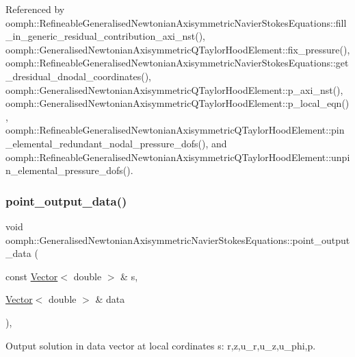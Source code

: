 Referenced by oomph\+::\+Refineable\+Generalised\+Newtonian\+Axisymmetric\+Navier\+Stokes\+Equations\+::fill\+\_\+in\+\_\+generic\+\_\+residual\+\_\+contribution\+\_\+axi\+\_\+nst(), oomph\+::\+Generalised\+Newtonian\+Axisymmetric\+Q\+Taylor\+Hood\+Element\+::fix\+\_\+pressure(), oomph\+::\+Refineable\+Generalised\+Newtonian\+Axisymmetric\+Navier\+Stokes\+Equations\+::get\+\_\+dresidual\+\_\+dnodal\+\_\+coordinates(), oomph\+::\+Generalised\+Newtonian\+Axisymmetric\+Q\+Taylor\+Hood\+Element\+::p\+\_\+axi\+\_\+nst(), oomph\+::\+Generalised\+Newtonian\+Axisymmetric\+Q\+Taylor\+Hood\+Element\+::p\+\_\+local\+\_\+eqn(), oomph\+::\+Refineable\+Generalised\+Newtonian\+Axisymmetric\+Q\+Taylor\+Hood\+Element\+::pin\+\_\+elemental\+\_\+redundant\+\_\+nodal\+\_\+pressure\+\_\+dofs(), and oomph\+::\+Refineable\+Generalised\+Newtonian\+Axisymmetric\+Q\+Taylor\+Hood\+Element\+::unpin\+\_\+elemental\+\_\+pressure\+\_\+dofs().

\mbox{\label{classoomph_1_1GeneralisedNewtonianAxisymmetricNavierStokesEquations_a8a97a39b3421984ca59a665be4abc2d8}} 
\subsubsection{\texorpdfstring{point\+\_\+output\+\_\+data()}{point\_output\_data()}}
{\footnotesize\ttfamily void oomph\+::\+Generalised\+Newtonian\+Axisymmetric\+Navier\+Stokes\+Equations\+::point\+\_\+output\+\_\+data (\begin{DoxyParamCaption}\item[{const \hyperlink{classoomph_1_1Vector}{Vector}$<$ double $>$ \&}]{s,  }\item[{\hyperlink{classoomph_1_1Vector}{Vector}$<$ double $>$ \&}]{data }\end{DoxyParamCaption})\hspace{0.3cm}{\ttfamily [inline]}, {\ttfamily [virtual]}}



Output solution in data vector at local cordinates s\+: r,z,u\+\_\+r,u\+\_\+z,u\+\_\+phi,p. 



